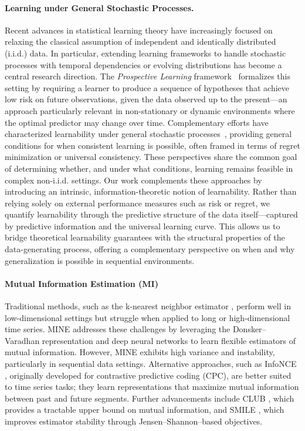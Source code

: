 \documentclass{article}
\begin{document}
\paragraph{Learning under General Stochastic Processes.}  
Recent advances in statistical learning theory have increasingly focused on relaxing the classical assumption of independent and identically distributed (i.i.d.) data. In particular, extending learning frameworks to handle stochastic processes with temporal dependencies or evolving distributions has become a central research direction. The \emph{Prospective Learning} framework~\cite{desilva2025prospectivelearninglearningdynamic} formalizes this setting by requiring a learner to produce a sequence of hypotheses that achieve low risk on future observations, given the data observed up to the present—an approach particularly relevant in non-stationary or dynamic environments where the optimal predictor may change over time. Complementary efforts have characterized learnability under general stochastic processes~\cite{dawid2022learnabilitygeneralstochasticprocesses, hanneke2020learninglearningpossibleuniversal}, providing general conditions for when consistent learning is possible, often framed in terms of regret minimization or universal consistency. These perspectives share the common goal of determining whether, and under what conditions, learning remains feasible in complex non-i.i.d. settings. Our work complements these approaches by introducing an intrinsic, information-theoretic notion of learnability. Rather than relying solely on external performance measures such as risk or regret, we quantify learnability through the predictive structure of the data itself—captured by predictive information and the universal learning curve. This allows us to bridge theoretical learnability guarantees with the structural properties of the data-generating process, offering a complementary perspective on when and why generalization is possible in sequential environments.


\paragraph{Mutual Information Estimation (MI)}
Traditional methods, such as the k-nearest neighbor estimator \cite{kraskov2004}, perform well in low-dimensional settings but struggle when applied to long or high-dimensional time series. MINE \cite{belghazi2018} addresses these challenges by leveraging the Donsker–Varadhan representation and deep neural networks to learn flexible estimators of mutual information. However, MINE exhibits high variance and instability, particularly in sequential data settings. Alternative approaches, such as InfoNCE \cite{oord2018}, originally developed for contrastive predictive coding (CPC), are better suited to time series tasks; they learn representations that maximize mutual information between past and future segments. Further advancements include CLUB \cite{cheng2020}, which provides a tractable upper bound on mutual information, and SMILE \cite{song2019}, which improves estimator stability through Jensen–Shannon–based objectives.
\end{document}

